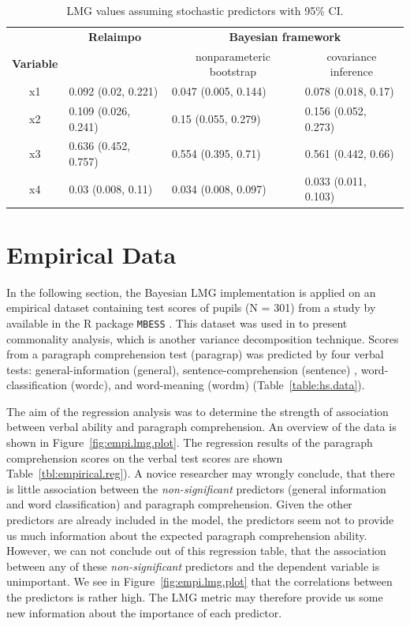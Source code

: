\documentclass[11pt,a4paper,twoside]{book}\usepackage[]{graphicx}\usepackage[]{color}
\begin{document}
\begin{table}[h]
\caption{LMG values assuming stochastic predictors with 95\% CI.}
\centering
\begin{tabular}{clll}
   \toprule
  & \multicolumn{1}{c}{\textbf{Relaimpo}} & \multicolumn{2}{c}{\textbf{Bayesian framework}} \\ \cmidrule(r){2-2}\cmidrule(l){3-4}
 \textbf{Variable} &  & \multicolumn{1}{c}{nonparameteric bootstrap}& \multicolumn{1}{c}{covariance inference} \\
 \midrule
x1 & 0.092 (0.02, 0.221)  & 0.047 (0.005, 0.144) &  0.078 (0.018, 0.17) \\ 
x2 & 0.109 (0.026, 0.241)  & 0.15 (0.055, 0.279)  & 0.156 (0.052, 0.273) \\ 
x3 & 0.636 (0.452, 0.757)  & 0.554 (0.395, 0.71)  & 0.561 (0.442, 0.66) \\ 
x4 & 0.03 (0.008, 0.11) & 0.034 (0.008, 0.097) & 0.033 (0.011, 0.103) \\ 
   \bottomrule
\end{tabular}
\label{tbl:nonstochEx1relaimpstoch}
\end{table}







\clearpage

\section{Empirical Data}
In the following section, the Bayesian LMG implementation is applied on an empirical dataset containing test scores of pupils (N = 301) from a study by \cite{Holzinger1939} available in the R package \texttt{MBESS} \citep{MBESS}. This dataset was used in \cite{Nimon2008} to present commonality analysis, which is another variance decomposition technique. Scores from a paragraph comprehension test (paragrap) was predicted by four verbal tests:  general-information (general),  sentence-comprehension (sentence) ,  word-classification (wordc), and  word-meaning (wordm) (Table~\ref{table:hs.data}). 

The aim of the regression analysis  was to determine the strength of association between verbal ability and paragraph comprehension.  
An overview of the data is shown in Figure~\ref{fig:empi.lmg.plot}. The regression results of the paragraph comprehension scores on the verbal test scores are shown Table~\ref{tbl:empirical.reg}). A novice researcher may wrongly conclude, that there is little association between the \textit{non-significant} predictors (general information and word classification) and paragraph comprehension. Given the other predictors are already included in the model, the predictors seem not to provide us much information about the expected paragraph comprehension ability. However, we can not conclude out of this regression table, that the association between any of these \textit{non-significant} predictors and the dependent variable is unimportant. We see in Figure~\ref{fig:empi.lmg.plot} that the correlations between the predictors is rather high. The LMG metric may therefore provide us some new information about the importance of each predictor. 
\end{document}
